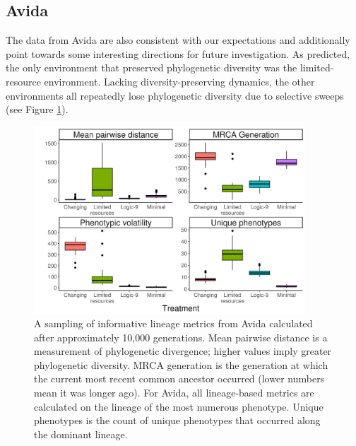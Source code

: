 \documentclass[letterpaper]{article}
\begin{document}
\subsection{Avida}

The data from Avida are also consistent with our expectations and additionally point towards some interesting directions for future investigation. As predicted, the only environment that preserved phylogenetic diversity was the limited-resource environment. Lacking diversity-preserving dynamics, the other environments all repeatedly lose phylogenetic diversity due to selective sweeps (see Figure \ref{fig:avida_metrics}).

\begin{figure}
    \centering
    \includegraphics[width=4in]{figs/metrics_avida.png}
    \caption{\small A sampling of informative lineage metrics from Avida calculated after approximately 10,000 generations. Mean pairwise distance is a measurement of phylogenetic divergence; higher values imply greater phylogenetic diversity. MRCA generation is the generation at which the current most recent common ancestor occurred (lower numbers mean it was longer ago). For Avida, all lineage-based metrics are calculated on the lineage of the most numerous phenotype. Unique phenotypes is the count of unique phenotypes that occurred along the dominant lineage.}
    \label{fig:avida_metrics}
\end{figure}
\end{document}
